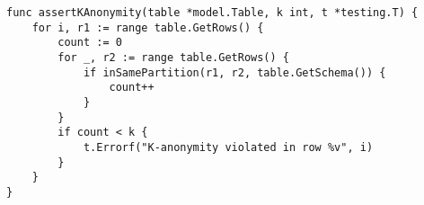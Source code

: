 \begin{lstlisting}[caption=Asserting k-anonymity,label=lst:test_k_anonymity,float,floatplacement=H]
func assertKAnonymity(table *model.Table, k int, t *testing.T) {
    for i, r1 := range table.GetRows() {
        count := 0
        for _, r2 := range table.GetRows() {
            if inSamePartition(r1, r2, table.GetSchema()) {
                count++
            }
        }
        if count < k {
            t.Errorf("K-anonymity violated in row %v", i)
        }
    }
}
\end{lstlisting}